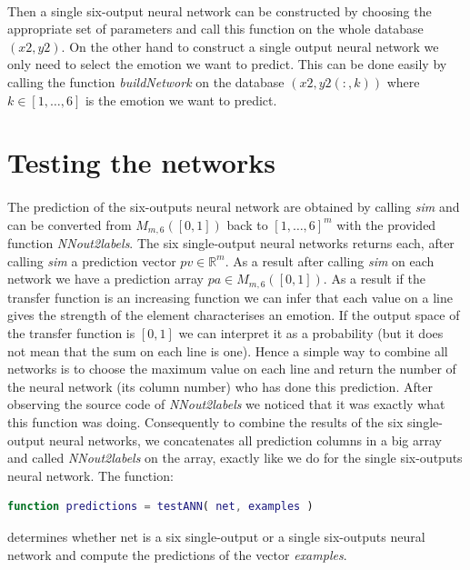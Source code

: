 \documentclass[a4paper,12pt,oneside,final]{report}
\newenvironment{changemargin}[2]{\begin{list}{}{%
\setlength{\topsep}{0pt}%
\setlength{\leftmargin}{0pt}%
\setlength{\rightmargin}{0pt}%
\setlength{\listparindent}{\parindent}%
\setlength{\itemindent}{\parindent}%
\setlength{\parsep}{0pt plus 1pt}%
\addtolength{\leftmargin}{#1}%
\addtolength{\rightmargin}{#2}%
}\item }{\end{list}}
\begin{document}
\paragraph{}
Then a single six-output neural network can be constructed by choosing the appropriate set of parameters and call this function on the whole database $(x2,y2)$. On the other hand to construct a single output neural network we only need to select the emotion we want to predict. This can be done easily by calling the function \textit{buildNetwork} on the database $(x2,y2(:,k))$ where $k\in[1,\hdots,6]$ is the emotion we want to predict.

\section{Testing the networks}
\paragraph{}
The prediction of the six-outputs neural network are obtained by calling \textit{sim} and can be converted from $M_{m,6}([0,1])$ back to $[1,\hdots,6]^m$ with the provided function \textit{NNout2labels}. The six single-output neural networks returns each, after calling \textit{sim} a prediction vector $pv\in \mathbb{R}^m$. As a result after calling \textit{sim} on each network we have a prediction array $pa\in M_{m,6}([0,1])$. As a result if the transfer function is an increasing function we can infer that each value on a line gives the strength of the element characterises an emotion. If the output space of the transfer function is $[0,1]$ we can interpret it as a probability (but it does not mean that the sum on each line is one). Hence a simple way to combine all networks is to choose the maximum value on each line and return the number of the neural network (its column number) who has done this prediction. After observing the source code of \textit{NNout2labels} we noticed that it was exactly what this function was doing. Consequently to combine the results of the six single-output neural networks, we concatenates all prediction columns in a big array and called \textit{NNout2labels} on the array, exactly like we do for the single six-outputs neural network. The function:
\begin{changemargin}{-5mm}{-5mm}
\begin{lstlisting}[language=Matlab, frame=single]
function predictions = testANN( net, examples )
\end{lstlisting}
\end{changemargin}
determines whether net is a six single-output or a single six-outputs neural network and compute the predictions of the vector \textit{examples}.
\end{document}
